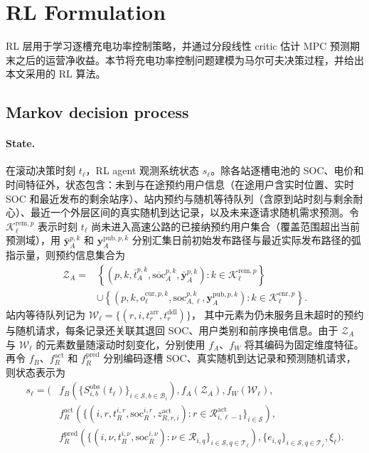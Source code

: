 \documentclass[12pt,a4paper,UTF8]{ctexart}
\begin{document}
\section{RL Formulation}

RL 层用于学习逐槽充电功率控制策略，并通过分段线性 critic 估计 MPC 预测期末之后的运营净收益。本节将充电功率控制问题建模为马尔可夫决策过程，并给出本文采用的 RL 算法。

\subsection{Markov decision process}

\paragraph{State.}
在滚动决策时刻 $t_\ell$，RL agent 观测系统状态 $s_\ell$。除各站逐槽电池的 SOC、电价和时间特征外，状态包含：未到与在途预约用户信息（在途用户含实时位置、实时 SOC 和最近发布的剩余站序）、站内预约与随机等待队列（含原到站时刻与剩余耐心）、最近一个外层区间的真实随机到达记录，以及未来逐请求随机需求预测。令
$\mathcal K_\ell^{\mathrm{rem},p}$ 表示时刻 $t_\ell$ 尚未进入高速公路的已接纳预约用户集合（覆盖范围超出当前预测域），用 $\bar{\mathbf y}_A^{p,k}$ 和 $\mathbf y_A^{\mathrm{pub},p,k}$ 分别汇集日前初始发布路径与最近实际发布路径的弧指示量，则预约信息集合为
\begin{equation}
\begin{aligned}
\mathcal Z_{A}
={}&
\left\{
\left(p,k,\bar t_A^{p,k},
\overline{\mathrm{soc}}_A^{p,k},
\bar{\mathbf y}_A^{p,k}\right):
k\in\mathcal K_\ell^{\mathrm{rem},p}
\right\}\\
&\cup
\left\{
\left(p,k,o_\ell^{\mathrm{cur},p,k},\mathrm{soc}_{A,\ell}^{p,k},
\mathbf y_A^{\mathrm{pub},p,k}\right):
k\in\mathcal K_\ell^{\mathrm{enr},p}
\right\}.
\end{aligned}
\label{eq:rl_reservation_information}
\end{equation}
站内等待队列记为
$\mathcal W_\ell=\{(r,i,t_r^{\mathrm{arr}},t_r^{\mathrm{ddl}})\}$，
其中元素为仍未服务且未超时的预约与随机请求，每条记录还关联其退回 SOC、用户类别和前序换电信息。由于 $\mathcal Z_{A}$ 与 $\mathcal W_\ell$ 的元素数量随滚动时刻变化，分别使用 $f_A$、$f_W$ 将其编码为固定维度特征。再令 $f_B$、$f_R^{\mathrm{act}}$ 和 $f_R^{\mathrm{pred}}$ 分别编码逐槽 SOC、真实随机到达记录和预测随机请求，则状态表示为
\begin{equation}
\begin{aligned}
s_\ell=\Big(&
f_B\!\left(\{S_{i,b}^{\mathrm{obs}}(t_\ell)\}_{i\in\mathcal S,b\in\mathcal B_i}\right),
f_A(\mathcal Z_{A}),
f_W(\mathcal W_\ell),\\
&
f_R^{\mathrm{act}}\!\left(
\{(i,r,t_R^{i,r},\mathrm{soc}_R^{i,r},z_{R,r,i}^{\mathrm{act}}):
r\in\mathcal R_{i,\ell-1}^{\mathrm{act}}\}_{i\in\mathcal S}
\right),\\
&
f_R^{\mathrm{pred}}\!\left(
\{(i,\nu,t_{R}^{i,\nu},\mathrm{soc}_{R}^{i,\nu}):
\nu\in\mathcal R_{i,q}\}_{i\in\mathcal S,q\in\mathcal T_\ell}
\right),
\{e_{i,q}\}_{i\in\mathcal S,q\in\mathcal T_\ell},
\xi_\ell
\Big).
\end{aligned}
\label{eq:rl_state}
\end{equation}
\end{document}

